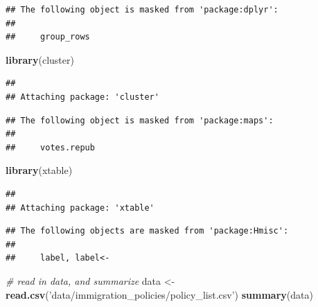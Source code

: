 \documentclass[]{article}
\newenvironment{Shaded}{\begin{snugshade}}{\end{snugshade}}
\newcommand{\CommentTok}[1]{\textcolor[rgb]{0.56,0.35,0.01}{\textit{#1}}}
\newcommand{\KeywordTok}[1]{\textcolor[rgb]{0.13,0.29,0.53}{\textbf{#1}}}
\newcommand{\NormalTok}[1]{#1}
\newcommand{\StringTok}[1]{\textcolor[rgb]{0.31,0.60,0.02}{#1}}
\begin{document}
\begin{verbatim}
## The following object is masked from 'package:dplyr':
## 
##     group_rows
\end{verbatim}

\begin{Shaded}
\begin{Highlighting}[]
\KeywordTok{library}\NormalTok{(cluster)}
\end{Highlighting}
\end{Shaded}

\begin{verbatim}
## 
## Attaching package: 'cluster'
\end{verbatim}

\begin{verbatim}
## The following object is masked from 'package:maps':
## 
##     votes.repub
\end{verbatim}

\begin{Shaded}
\begin{Highlighting}[]
\KeywordTok{library}\NormalTok{(xtable)}
\end{Highlighting}
\end{Shaded}

\begin{verbatim}
## 
## Attaching package: 'xtable'
\end{verbatim}

\begin{verbatim}
## The following objects are masked from 'package:Hmisc':
## 
##     label, label<-
\end{verbatim}

\begin{Shaded}
\begin{Highlighting}[]
\CommentTok{# read in data, and summarize}
\NormalTok{data <-}\StringTok{ }\KeywordTok{read.csv}\NormalTok{(}\StringTok{'data/immigration_policies/policy_list.csv'}\NormalTok{)}
\KeywordTok{summary}\NormalTok{(data)}
\end{Highlighting}
\end{Shaded}
\end{document}
